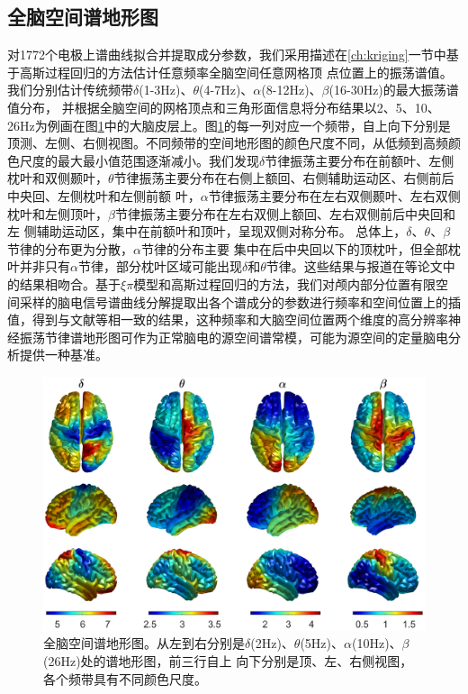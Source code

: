 \subsection{全脑空间谱地形图}
对1772个电极上谱曲线拟合并提取成分参数，我们采用描述在\ref{ch:kriging}一节中基于高斯过程回归的方法估计任意频率全脑空间任意网格顶
点位置上的振荡谱值。我们分别估计传统频带$\delta$(1-3Hz)、$\theta$(4-7Hz)、$\alpha$(8-12Hz)、$\beta$(16-30Hz)的最大振荡谱值分布，
并根据全脑空间的网格顶点和三角形面信息将分布结果以2、5、10、26Hz为例画在图\ref{7:map}中的大脑皮层上。图\ref{7:map}的每一列对应一个频带，自上向下分别是顶测、左侧、右侧视图。不同频带的空间地形图的颜色尺度不同，从低频到高频颜色尺度的最大最小值范围逐渐减小。我们发现$\delta$节律振荡主要分布在前额叶、左侧枕叶和双侧颞叶，$\theta$节律振荡主要分布在右侧上额回、右侧辅助运动区、右侧前后中央回、左侧枕叶和左侧前额
叶，$\alpha$节律振荡主要分布在左右双侧颞叶、左右双侧枕叶和左侧顶叶，$\beta$节律振荡主要分布在左右双侧上额回、左右双侧前后中央回和左
侧辅助运动区，集中在前额叶和顶叶，呈现双侧对称分布。 总体上，$\delta$、$\theta$、$\beta$节律的分布更为分散，$\alpha$节律的分布主要
集中在后中央回以下的顶枕叶，但全部枕叶并非只有$\alpha$节律，部分枕叶区域可能出现$\delta$和$\theta$节律。这些结果与报道在\cite{gastaut1949enregistrement,jasper1949electrocorticograms,sem1953depth,chatrian1960depth,sem1956electroencephalographic,perez1962electrographic,graf1984electrocorticography,frauscher2018atlas}等论文中的结果相吻合。基于$\xi\pi$模型和高斯过程回归的方法，我们对颅内部分位置有限空间采样的脑电信号谱曲线分解提取出各个谱成分的参数进行频率和空间位置上的插值，得到与文献等相一致的结果，这种频率和大脑空间位置两个维度的高分辨率神经振荡节律谱地形图可作为正常脑电的源空间谱常模，可能为源空间的定量脑电分析提供一种基准。
\begin{figure}[!h]
	\includegraphics[width=15cm]{pic/xipi/map.png}
	\caption{全脑空间谱地形图。从左到右分别是$\delta$(2Hz)、$\theta$(5Hz)、$\alpha$(10Hz)、$\beta$(26Hz)处的谱地形图，前三行自上
	向下分别是顶、左、右侧视图，各个频带具有不同颜色尺度。}
	\label{7:map}
\end{figure}

